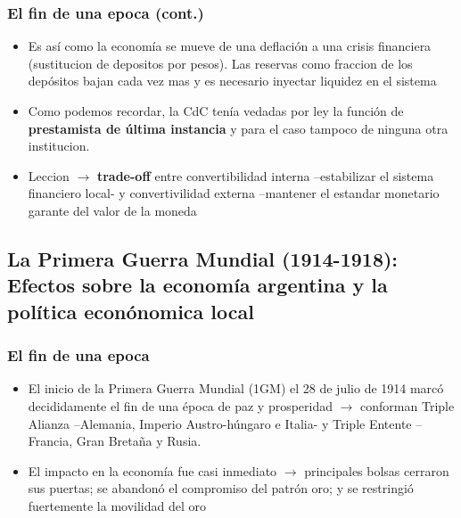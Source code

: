\documentclass[14pt,aspectratio=169]{beamer}
\begin{document}
      
\begin{frame}\frametitle{El fin de una epoca (cont.)}
    \begin{itemize}\itemsep 10pt
      \item Es así como la economía se mueve de una deflación a una
        crisis financiera (sustitucion de depositos por pesos). Las
        reservas como fraccion de los depósitos bajan cada vez mas y
        es necesario inyectar liquidez en el sistema
        \item Como podemos recordar, la CdC tenía vedadas por ley la
          función de \textbf{prestamista de última instancia} y para
          el caso tampoco de ninguna otra institucion.
          \item Leccion $\longrightarrow$ \textbf{trade-off} entre
            convertibilidad interna --estabilizar el sistema
            financiero local- y convertivilidad externa --mantener el
            estandar monetario garante del valor de la moneda
          \end{itemize}
      \end{frame}
      
      
      
  
  \subsection{La Primera Guerra Mundial (1914-1918): Efectos sobre la economía
    argentina y la política econónomica local}


   \begin{frame}\frametitle{El fin de una epoca}
    \begin{itemize}\itemsep 10pt
      \item El inicio de la Primera Guerra Mundial (1GM) el 28 de julio de
        1914 marcó decididamente el fin de una época de paz y
        prosperidad $\longrightarrow$ conforman Triple Alianza
        --Alemania, Imperio Austro-húngaro e Italia- y Triple Entente
        --Francia, Gran Bretaña y Rusia.
        \item El impacto en la economía fue casi inmediato
          $\longrightarrow$ principales bolsas cerraron sus puertas;
          se abandonó el compromiso del patrón oro; y se restringió
          fuertemente la movilidad del oro
       \end{itemize}
      \end{frame}
\end{document}
